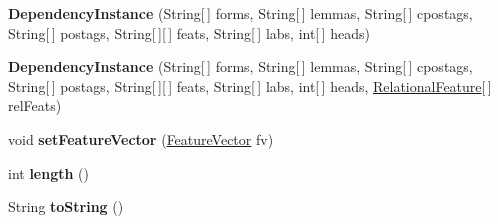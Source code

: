 \begin{DoxyCompactItemize}
\item 
\hypertarget{classmstparser_1_1DependencyInstance_a372249c28267a7a7edc4bfb541e179c9}{
{\bfseries DependencyInstance} (String\mbox{[}$\,$\mbox{]} forms, String\mbox{[}$\,$\mbox{]} lemmas, String\mbox{[}$\,$\mbox{]} cpostags, String\mbox{[}$\,$\mbox{]} postags, String\mbox{[}$\,$\mbox{]}\mbox{[}$\,$\mbox{]} feats, String\mbox{[}$\,$\mbox{]} labs, int\mbox{[}$\,$\mbox{]} heads)}
\label{classmstparser_1_1DependencyInstance_a372249c28267a7a7edc4bfb541e179c9}

\item 
\hypertarget{classmstparser_1_1DependencyInstance_ad7ae18e900311f47bc0b1926bcf9a7f9}{
{\bfseries DependencyInstance} (String\mbox{[}$\,$\mbox{]} forms, String\mbox{[}$\,$\mbox{]} lemmas, String\mbox{[}$\,$\mbox{]} cpostags, String\mbox{[}$\,$\mbox{]} postags, String\mbox{[}$\,$\mbox{]}\mbox{[}$\,$\mbox{]} feats, String\mbox{[}$\,$\mbox{]} labs, int\mbox{[}$\,$\mbox{]} heads, \hyperlink{classmstparser_1_1RelationalFeature}{RelationalFeature}\mbox{[}$\,$\mbox{]} relFeats)}
\label{classmstparser_1_1DependencyInstance_ad7ae18e900311f47bc0b1926bcf9a7f9}

\item 
\hypertarget{classmstparser_1_1DependencyInstance_a0bad164a9e2f6aea53cf105c99657d10}{
void {\bfseries setFeatureVector} (\hyperlink{classmstparser_1_1FeatureVector}{FeatureVector} fv)}
\label{classmstparser_1_1DependencyInstance_a0bad164a9e2f6aea53cf105c99657d10}

\item 
\hypertarget{classmstparser_1_1DependencyInstance_adf88ba5d4c9adbedfc725b392d1ad228}{
int {\bfseries length} ()}
\label{classmstparser_1_1DependencyInstance_adf88ba5d4c9adbedfc725b392d1ad228}

\item 
\hypertarget{classmstparser_1_1DependencyInstance_a51dfeb22cfdacd009eca875491df81bb}{
String {\bfseries toString} ()}
\label{classmstparser_1_1DependencyInstance_a51dfeb22cfdacd009eca875491df81bb}

\end{DoxyCompactItemize}
